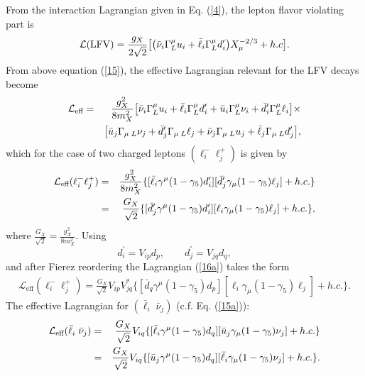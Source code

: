 \documentclass{ws-ijmpa}
\begin{document}
From the interaction Lagrangian given in Eq. (\ref{4}), the lepton flavor violating part is
\begin{eqnarray}
\mathcal{L}(\text{LFV})={g_{X}\over
2\sqrt2}\big[\big(\bar\nu_i\Gamma^{\mu}_L
u_i+\bar \ell_i\Gamma^{\mu}_L
d^{\prime}_i\big)X_\mu^{-2/3}+h.c\big]\label{15}.
\end{eqnarray}
From above equation (\ref{15}), the effective Lagrangian relevant for the LFV decays become
\begin{eqnarray}
\mathcal{L}_{\text{eff}}&=&{g^2_{X}\over
8m^2_{X}}\big[\bar\nu_i\Gamma^{\mu}_L
u_i+\bar \ell_i\Gamma^{\mu}_L
d^{\prime}_i + \bar{u}_{i}\Gamma^{\mu}_{L}\nu_{i}+\bar{d}^{\prime}_{i}\Gamma^{\mu}_{L}\ell_{i}\big]\times \notag\\
&&\big[\bar u_j\Gamma_{\mu\; L}
\nu_j+\bar d^{\prime}_j\Gamma_{\mu\; L}
\ell_j  + \bar{\nu}_{j}\Gamma_{\mu\; L}u_{j}+\bar \ell_{j}\Gamma_{\mu\; L}{d}^{\prime}_{j}\big]\label{15a},
\end{eqnarray}
which for the case of two charged leptons $(\ell^{-}_{i} \ell^{+}_{j})$ is given by
\begin{eqnarray}
\mathcal{L}_{\text{eff}}(\ell^{-}_{i}\ell^{+}_{j})&=&\frac{g^2_X}{8m^{2}_X}\{[\bar
\ell_i\gamma^{\mu}(1-\gamma_5)d^{\prime}_i][\bar{d}^{\prime}_{j}\gamma_{\mu}(1-\gamma_5)\ell_{j}]+h.c.\}\notag \\
&=&\frac{G_X}{\sqrt{2}}\{[\bar{d}^{\prime}_{j}\gamma^{\mu}(1-\gamma_5)d^{\prime}_i][\ell_i \gamma_{\mu}(1-\gamma_5)\ell_{j}]+ h.c.\} \label{16a},
\end{eqnarray}
where $\frac{G_X}{\sqrt2}=\frac{g^2_X}{8 m^2_X}$. Using
\begin{equation}
d^{\prime}_i = V_{ip} d_p, \quad\quad d^{\prime}_j = V_{jq} d_q,\quad\quad   \label{17}
\end{equation}
and after Fierez reordering the Lagrangian (\ref{16a}) takes the form
\begin{eqnarray}
\mathcal{L}_{\text{eff}}(\ell^{-}_{i}\ell^{+}_{j}) = \frac{G_X}{\sqrt{2}}V_{ip}V^{*}_{jq}\{[\bar{d}_{q}\gamma^{\mu}(1-\gamma_5)d_p][\ell_i \gamma_{\mu}(1-\gamma_5)\ell_{j}]+h.c.\}\label{16}.
\end{eqnarray}
The effective Lagrangian for $(\bar{\ell}_{i}\;\bar{\nu}_j)$ (c.f. Eq. (\ref{15a})):
\begin{eqnarray}
\mathcal{L}_{\text{eff}}(\bar{\ell}_{i}\;\bar{\nu}_j) &=& \frac{G_X}{\sqrt2}V_{iq}\{[\bar{\ell}_{i}\gamma^{\mu}(1-\gamma_5)d_q][\bar{u}_{j}\gamma_{\mu}(1-\gamma_5)\nu_{j}]+ h.c.\}\notag \\
&=&  \frac{G_X}{\sqrt2}V_{iq}\{[\bar{u}_{j}\gamma^{\mu}(1-\gamma_5)d_q][\bar{\ell}_{i}\gamma_{\mu}(1-\gamma_5)\nu_{j}]+ h.c.\}\label{18}.
\end{eqnarray}
\end{document}
